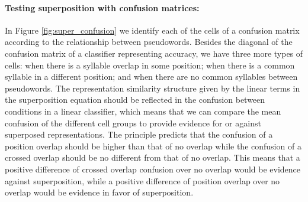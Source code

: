 \paragraph{Testing superposition with confusion matrices:}
In Figure \ref{fig:super_confusion} we identify each of the cells of a confusion matrix according to the relationship between pseudowords.
Besides the diagonal of the confusion matrix of a classifier representing accuracy, we have three more types of cells: when there is a syllable overlap in some position; when there is a common syllable in a different position; and when there are no common syllables between pseudowords.
The representation similarity structure given by the linear terms in the superposition equation should be reflected in the confusion between conditions in a linear classifier, which means that we can compare the mean confusion of the different cell groups to provide evidence for or against superposed representations.
The principle predicts that the confusion of a position overlap should be higher than that of no overlap while the confusion of a crossed overlap should be no different from that of no overlap.
This means that a positive difference of crossed overlap confusion over no overlap would be evidence against superposition, while a positive difference of position overlap over no overlap would be evidence in favor of superposition.


